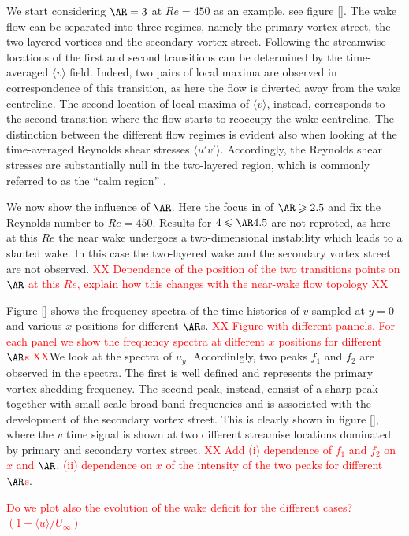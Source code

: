 We start considering $\AR=3$ at $Re=450$ as an example, see figure \ref{}. The wake flow can be separated into three regimes, namely the primary vortex street, the two layered vortices and the secondary vortex street. Following \cite{jiang-cheng-2019} the streamwise locations of the first and second transitions can be determined by the time-averaged $\langle v \rangle$ field. Indeed, two pairs of local maxima are observed in correspondence of this transition, as here the flow is diverted away from the wake centreline. The second location of local maxima of $\langle v \rangle$, instead, corresponds to the second transition where the flow starts to reoccupy the wake centreline. The distinction between the different flow regimes is evident also when looking at the time-averaged Reynolds shear stresses $\langle u'v' \rangle$. Accordingly, the Reynolds shear stresses are substantially null in the two-layered region, which is commonly referred to as the ``calm region'' \citep{durgin-karlsson-1971}.

We now show the influence of $\AR$. Here the focus in of $\AR \ge 2.5$ and fix the Reynolds number to $Re=450$. Results for $4 \le \AR 4.5$ are not reproted, as here at this $Re$ the near wake undergoes a two-dimensional instability which leads to a slanted wake. In this case the two-layered wake and the secondary vortex street are not observed. \textcolor{red}{XX Dependence of the position of the two transitions points on $\AR$ at this $Re$, explain how this changes with the near-wake flow topology XX}

Figure \ref{} shows the frequency spectra of the time histories of $v$ sampled at $y=0$ and various $x$ positions for different $\AR$s. \textcolor{red}{XX Figure with different pannels. For each panel we show the frequency spectra at different $x$ positions for different $\AR$s XX}We look at the spectra of $u_y$. Accordinlgly, two peaks $f_1$ and $f_2$ are observed in the spectra. The first is well defined and represents the primary vortex shedding frequency. The second peak, instead, consist of a sharp peak together with small-scale broad-band frequencies and is associated with the development of the secondary vortex street. This is clearly shown in figure \ref{}, where the $v$ time signal is shown at two different streamise locations dominated by primary and secondary vortex street. \textcolor{red}{XX Add (i) dependence of $f_1$ and $f_2$ on $x$ and $\AR$, (ii) dependence on $x$ of the intensity of the two peaks for different $\AR$s}.

\textcolor{red}{Do we plot also the evolution of the wake deficit for the different cases? $(1-\langle u \rangle/U_\infty)$}

